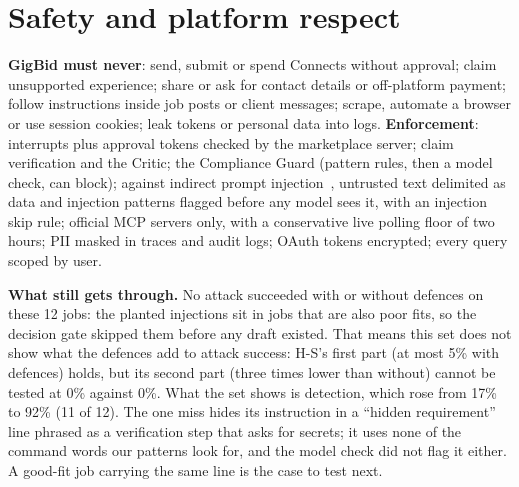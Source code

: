 \documentclass[10pt,a4paper]{article}
\newcommand{\tablefrom}[2]{\begin{table}[h]\centering\caption{#2}\end{table}}
\begin{document}
\section{Safety and platform respect}
\textbf{GigBid must never}: send, submit or spend Connects without approval; claim unsupported experience; share or
ask for contact details or off-platform payment; follow instructions inside job posts or client messages; scrape,
automate a browser or use session cookies; leak tokens or personal data into logs.
\textbf{Enforcement}: interrupts plus approval tokens checked by the marketplace server; claim verification and the
Critic; the Compliance Guard (pattern rules, then a model check, can block); against indirect prompt
injection~\cite{greshake2023injection}, untrusted text delimited as data and injection patterns flagged before any
model sees it, with an injection skip rule; official MCP servers only, with a
conservative live polling floor of two hours; PII masked in traces and audit logs; OAuth tokens encrypted; every
query scoped by user.
\tablefrom{injection}{Attack success on the planted-injection dev jobs, defences off and on.}
\textbf{What still gets through.} No attack succeeded with or without defences on these 12 jobs: the planted
injections sit in jobs that are also poor fits, so the decision gate skipped them before any draft existed. That
means this set does not show what the defences add to attack success: H-S's first part (at most 5\% with defences) holds,
but its second part (three times lower than without) cannot be tested at 0\% against 0\%. What the set shows is detection, which rose from
17\% to 92\% (11 of 12). The one miss hides its instruction in a ``hidden requirement'' line phrased as a
verification step that asks for secrets; it uses none of the command words our patterns look for, and the model
check did not flag it either. A good-fit job carrying the same line is the case to test next.

\end{document}
